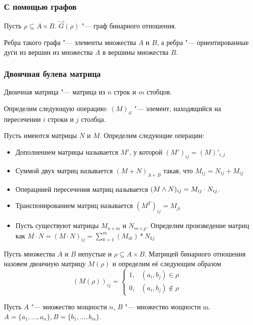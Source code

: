 \subsubsection{С помощью графов}

Пусть $\rho \subseteq A \times B$. $\vec{G}(\rho)$ "--- граф бинарного отношения.

Ребра такого графа "--- элементы множества $A$ и $B$, а ребра "--- ориентированные дуги 
из вершин из множества $A$ в вершины множества $B$.

\subsubsection{Двоичная булева матрица}

Двоичная матрица "--- матрица из $n$ строк и $m$ стобцов.

Определим следующую операцию: $(M)_{il}$ "--- элемент, находящийся на пересечении $i$ строки и $j$ столбца.

Пусть имеются матрицы $N$ и $M$. Определим следующие операции:

\begin{itemize}
    \item Дополнением матрицы называется $M'$, у которой $(M')_{ij} = (M)'_{i, j}$
    \item Суммой двух матриц называется $(M + N)_{A + B}$ такая, что $M_{ij} = N_{ij} + M_{ij}$
    \item Операциией пересечения матриц называется $(M \wedge N)_{ij} = M_{ij} \cdot N_{ij}$.
    \item Транспонированием матриц называется $(M^T)_{ij} = M_{ji}$
    \item Пусть существуют матрицы $M_{n \times m}$ и $N_{m \times p}$. Определим произведение
    матриц как $\displaystyle M \cdot N = (M \cdot N)_{ij} = \sum_{k = 1}^m(M_{ik}) * N_{kj}$
\end{itemize}

Пусть множества $A$ и $B$ непустые и $\rho \subseteq A \times B$. 
Матрицей бинарного отношения назовем двоичную матрицу $M(\rho)$ и
определим её следующим образом 
\begin{equation}
    (M(\rho))_{ij} = \begin{cases}
        1, & (a_i, b_j) \in \rho \\
        0, & (a_i, b_j) \notin \rho
    \end{cases}
\end{equation}

Пусть $A$ "--- множество мощности $n$, $B$ "--- множество мощности m.
$A = \{a_1, \dots, a_n\}, B = \{b_1, \dots, b_m\}$.

